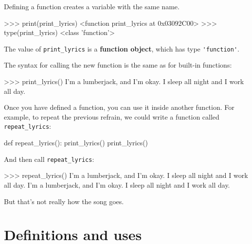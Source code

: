 %
%

Defining a function creates a variable with the same name.

\beforeverb
\begin{pyinterpreter}
>>> print(print_lyrics)
<function print_lyrics at 0x03092C00>
>>> type(print_lyrics)
<class 'function'>
\end{pyinterpreter}
\afterverb
%
The value of \verb"print_lyrics" is a {\bf function object}, which
has type \verb"'function'".


The syntax for calling the new function is the same as
for built-in functions:

\beforeverb
\begin{pyinterpreter}
>>> print_lyrics()
I'm a lumberjack, and I'm okay.
I sleep all night and I work all day.
\end{pyinterpreter}
\afterverb
%
Once you have defined a function, you can use it inside another
function.  For example, to repeat the previous refrain, we could write
a function called \verb"repeat_lyrics":

\beforeverb
\begin{pycode}
def repeat_lyrics():
    print_lyrics()
    print_lyrics()
\end{pycode}
\afterverb
%
And then call \verb"repeat_lyrics":

\beforeverb
\begin{pyinterpreter}
>>> repeat_lyrics()
I'm a lumberjack, and I'm okay.
I sleep all night and I work all day.
I'm a lumberjack, and I'm okay.
I sleep all night and I work all day.
\end{pyinterpreter}
\afterverb
%
But that's not really how the song goes.


\section{Definitions and uses}

